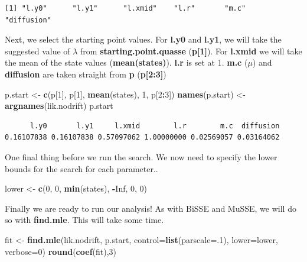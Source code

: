 \documentclass[
]{book}
\newenvironment{Shaded}{\begin{snugshade}}{\end{snugshade}}
\newcommand{\DataTypeTok}[1]{\textcolor[rgb]{0.13,0.29,0.53}{#1}}
\newcommand{\DecValTok}[1]{\textcolor[rgb]{0.00,0.00,0.81}{#1}}
\newcommand{\KeywordTok}[1]{\textcolor[rgb]{0.13,0.29,0.53}{\textbf{#1}}}
\newcommand{\NormalTok}[1]{#1}
\newcommand{\OperatorTok}[1]{\textcolor[rgb]{0.81,0.36,0.00}{\textbf{#1}}}
\newcommand{\OtherTok}[1]{\textcolor[rgb]{0.56,0.35,0.01}{#1}}
\newcommand{\StringTok}[1]{\textcolor[rgb]{0.31,0.60,0.02}{#1}}
\begin{document}
\begin{verbatim}
[1] "l.y0"      "l.y1"      "l.xmid"    "l.r"       "m.c"       "diffusion"
\end{verbatim}

Next, we select the starting point values. For \textbf{l.y0} and \textbf{l.y1}, we will take the suggested value of \(\lambda\) from \textbf{starting.point.quasse} (\textbf{p{[}1{]}}). For \textbf{l.xmid} we will take the mean of the state values (\textbf{mean(states)}). \textbf{l.r} is set at 1. \textbf{m.c} (\(\mu\)) and \textbf{diffusion} are taken straight from \textbf{p} (\textbf{p{[}2:3{]}})

\begin{Shaded}
\begin{Highlighting}[]
\NormalTok{p.start \textless{}{-}}\StringTok{ }\KeywordTok{c}\NormalTok{(p[}\DecValTok{1}\NormalTok{], p[}\DecValTok{1}\NormalTok{], }\KeywordTok{mean}\NormalTok{(states), }\DecValTok{1}\NormalTok{, p[}\DecValTok{2}\OperatorTok{:}\DecValTok{3}\NormalTok{])}
\KeywordTok{names}\NormalTok{(p.start) \textless{}{-}}\StringTok{ }\KeywordTok{argnames}\NormalTok{(lik.nodrift)}
\NormalTok{p.start}
\end{Highlighting}
\end{Shaded}

\begin{verbatim}
      l.y0       l.y1     l.xmid        l.r        m.c  diffusion 
0.16107838 0.16107838 0.57097062 1.00000000 0.02569057 0.03164062 
\end{verbatim}

One final thing before we run the search. We now need to specify the lower bounds for the search for each parameter..

\begin{Shaded}
\begin{Highlighting}[]
\NormalTok{lower \textless{}{-}}\StringTok{ }\KeywordTok{c}\NormalTok{(}\DecValTok{0}\NormalTok{, }\DecValTok{0}\NormalTok{, }\KeywordTok{min}\NormalTok{(states), }\OperatorTok{{-}}\OtherTok{Inf}\NormalTok{, }\DecValTok{0}\NormalTok{, }\DecValTok{0}\NormalTok{)}
\end{Highlighting}
\end{Shaded}

Finally we are ready to run our analysis! As with BiSSE and MuSSE, we will do so with \textbf{find.mle}. This will take some time.

\begin{Shaded}
\begin{Highlighting}[]
\NormalTok{fit \textless{}{-}}\StringTok{ }\KeywordTok{find.mle}\NormalTok{(lik.nodrift, p.start, }
                \DataTypeTok{control=}\KeywordTok{list}\NormalTok{(}\DataTypeTok{parscale=}\NormalTok{.}\DecValTok{1}\NormalTok{), }
                \DataTypeTok{lower=}\NormalTok{lower, }\DataTypeTok{verbose=}\DecValTok{0}\NormalTok{)}
\KeywordTok{round}\NormalTok{(}\KeywordTok{coef}\NormalTok{(fit),}\DecValTok{3}\NormalTok{)}
\end{Highlighting}
\end{Shaded}
\end{document}
